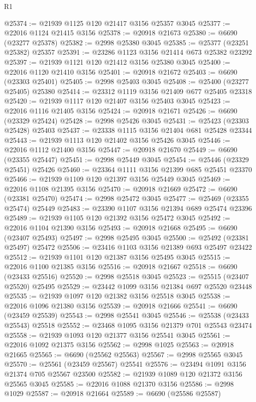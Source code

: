 \begin{lexlean}{R1}
\begin{coremodule}
@25374 := @21939 @1125 @120 @21417 @3156 @25357 @3045
@25377 := @22016 @1124 @21415 @3156
@25378 := @20918 @21673
@25380 := @6690 (@23277 @25378)
@25382 := @2998 @25380 @3045
@25385 := @25377 (@23251 @25382) @25357
@25391 := @23286 @1123 @3156 @21414 @673 @25382 @23292
@25397 := @21939 @1121 @120 @21412 @3156 @25380 @3045
@25400 := @22016 @1120 @21410 @3156
@25401 := @20918 @21672
@25403 := @6690 (@23303 @25401)
@25405 := @2998 @25403 @3045
@25408 := @25400 (@23277 @25405) @25380
@25414 := @23312 @1119 @3156 @21409 @677 @25405 @23318
@25420 := @21939 @1117 @120 @21407 @3156 @25403 @3045
@25423 := @22016 @1116 @21405 @3156
@25424 := @20918 @21671
@25426 := @6690 (@23329 @25424)
@25428 := @2998 @25426 @3045
@25431 := @25423 (@23303 @25428) @25403
@25437 := @23338 @1115 @3156 @21404 @681 @25428 @23344
@25443 := @21939 @1113 @120 @21402 @3156 @25426 @3045
@25446 := @22016 @1112 @21400 @3156
@25447 := @20918 @21670
@25449 := @6690 (@23355 @25447)
@25451 := @2998 @25449 @3045
@25454 := @25446 (@23329 @25451) @25426
@25460 := @23364 @1111 @3156 @21399 @685 @25451 @23370
@25466 := @21939 @1109 @120 @21397 @3156 @25449 @3045
@25469 := @22016 @1108 @21395 @3156
@25470 := @20918 @21669
@25472 := @6690 (@23381 @25470)
@25474 := @2998 @25472 @3045
@25477 := @25469 (@23355 @25474) @25449
@25483 := @23390 @1107 @3156 @21394 @689 @25474 @23396
@25489 := @21939 @1105 @120 @21392 @3156 @25472 @3045
@25492 := @22016 @1104 @21390 @3156
@25493 := @20918 @21668
@25495 := @6690 (@23407 @25493)
@25497 := @2998 @25495 @3045
@25500 := @25492 (@23381 @25497) @25472
@25506 := @23416 @1103 @3156 @21389 @693 @25497 @23422
@25512 := @21939 @1101 @120 @21387 @3156 @25495 @3045
@25515 := @22016 @1100 @21385 @3156
@25516 := @20918 @21667
@25518 := @6690 (@23433 @25516)
@25520 := @2998 @25518 @3045
@25523 := @25515 (@23407 @25520) @25495
@25529 := @23442 @1099 @3156 @21384 @697 @25520 @23448
@25535 := @21939 @1097 @120 @21382 @3156 @25518 @3045
@25538 := @22016 @1096 @21380 @3156
@25539 := @20918 @21666
@25541 := @6690 (@23459 @25539)
@25543 := @2998 @25541 @3045
@25546 := @25538 (@23433 @25543) @25518
@25552 := @23468 @1095 @3156 @21379 @701 @25543 @23474
@25558 := @21939 @1093 @120 @21377 @3156 @25541 @3045
@25561 := @22016 @1092 @21375 @3156
@25562 := @2998 @1025
@25563 := @20918 @21665
@25565 := @6690 (@25562 @25563)
@25567 := @2998 @25565 @3045
@25570 := @25561 (@23459 @25567) @25541
@25576 := @23494 @1091 @3156 @21374 @705 @25567 @23500
@25582 := @21939 @1089 @120 @21372 @3156 @25565 @3045
@25585 := @22016 @1088 @21370 @3156
@25586 := @2998 @1029
@25587 := @20918 @21664
@25589 := @6690 (@25586 @25587)

\end{coremodule}
\end{lexlean}
